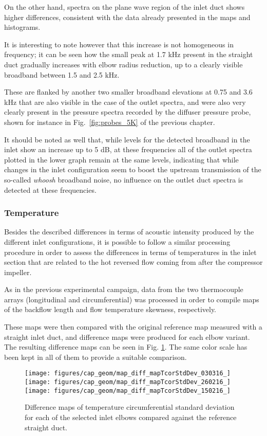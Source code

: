 On the other hand, spectra on the plane wave region of the inlet duct shows higher differences, consistent with the data already presented in the maps and histograms. 

It is interesting to note however that this increase is not homogeneous in frequency; it can be seen how the small peak at 1.7 kHz present in the straight duct gradually increases with elbow radius reduction, up to a clearly visible broadband between 1.5 and 2.5 kHz.

These are flanked by another two smaller broadband elevations at 0.75 and 3.6 kHz that are also visible in the case of the outlet spectra, and were also very clearly present in the pressure spectra recorded by the diffuser pressure probe, shown for instance in Fig.~\ref{fig:probes_5K} of the previous chapter.

It should be noted as well that, while levels for the detected broadband in the inlet show an increase up to 5 dB, at these frequencies all of the outlet spectra plotted in the lower graph remain at the same levels, indicating that while changes in the inlet configuration seem to boost the upstream transmission of the so-called \emph{whoosh} broadband noise, no influence on the outlet duct spectra is detected at these frequencies.

\subsubsection{Temperature}

Besides the described differences in terms of acoustic intensity produced by the different inlet configurations, it is possible to follow a similar processing procedure in order to assess the differences in terms of temperatures in the inlet section that are related to the hot reversed flow coming from after the compressor impeller.

As in the previous experimental campaign, data from the two thermocouple arrays (longitudinal and circumferential) was processed in order to compile maps of the backflow length and flow temperature skewness, respectively.

These maps were then compared with the original reference map measured with a straight inlet duct, and difference maps were produced for each elbow variant. The resulting difference maps can be seen in Fig. \ref{fig:map_diff_std}. The same color scale has been kept in all of them to provide a suitable comparison.

\begin{figure}[tb!]
\centering
\texttt{[image: figures/cap\_geom/map\_diff\_mapTcorStdDev\_030316\_]}\hspace{4mm}
\texttt{[image: figures/cap\_geom/map\_diff\_mapTcorStdDev\_260216\_]}\\[3mm]
\texttt{[image: figures/cap\_geom/map\_diff\_mapTcorStdDev\_150216\_]}\hspace{4mm}
\caption[Difference maps for temperature skewness]{Difference maps of temperature circumferential standard deviation for each of the selected inlet elbows compared against the reference straight duct.}
\label{fig:map_diff_std}
\end{figure}


